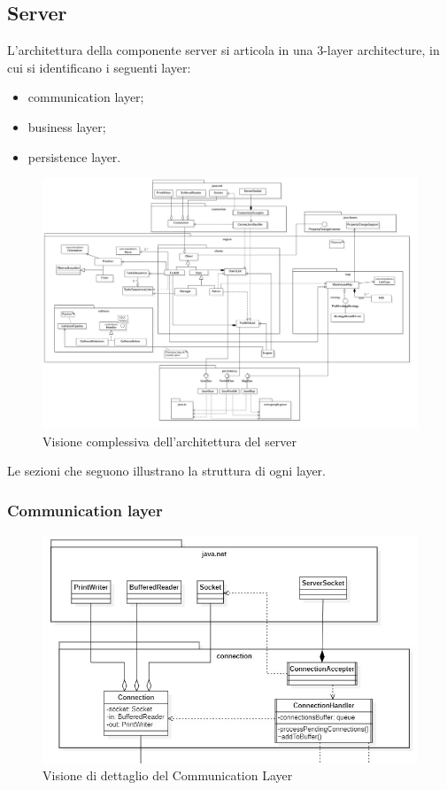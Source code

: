\clearpage
\subsection{Server}

L'architettura della componente server si articola in una 3-layer architecture, in cui si identificano i seguenti layer:
\begin{itemize}
	\item communication layer;
	\item business layer;
	\item persistence layer.
\end{itemize}

\begin{figure}[H]
	\centering
	\includegraphics[scale=0.22]{res/diagrams/server/server_complessivo_minimal.jpg}
	\caption{Visione complessiva dell'architettura del server}
\end{figure}

Le sezioni che seguono illustrano la struttura di ogni layer.

\clearpage
\subsubsection{Communication layer}
\label{communication-layer}

\begin{figure}[H]
	\centering
	\includegraphics[scale=0.55]{res/diagrams/server/server_communication.jpg}
	\caption{Visione di dettaglio del Communication Layer}
\end{figure}


